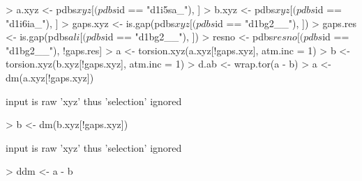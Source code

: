 \documentclass[a4paper]{article}
\begin{document}
\begin{Schunk}
\begin{Sinput}
> a.xyz <- pdbs$xyz[(pdbs$id == "d1i5sa_"), ]
> b.xyz <- pdbs$xyz[(pdbs$id == "d1i6ia_"), ]
> gaps.xyz <- is.gap(pdbs$xyz[(pdbs$id == "d1bg2__"), ])
> gaps.res <- is.gap(pdbs$ali[(pdbs$id == "d1bg2__"), ])
> resno <- pdbs$resno[(pdbs$id == "d1bg2__"), !gaps.res]
> a <- torsion.xyz(a.xyz[!gaps.xyz], atm.inc = 1)
> b <- torsion.xyz(b.xyz[!gaps.xyz], atm.inc = 1)
> d.ab <- wrap.tor(a - b)
> a <- dm(a.xyz[!gaps.xyz])
\end{Sinput}
\begin{Soutput}
input is raw 'xyz' thus 'selection' ignored 
\end{Soutput}
\begin{Sinput}
> b <- dm(b.xyz[!gaps.xyz])
\end{Sinput}
\begin{Soutput}
input is raw 'xyz' thus 'selection' ignored 
\end{Soutput}
\begin{Sinput}
> ddm <- a - b
\end{Sinput}
\end{Schunk}
\end{document}

